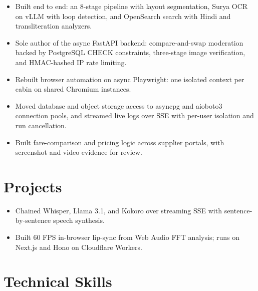 \documentclass[10pt,a4paper]{article}
\begin{document}
\begin{itemize}
  \item Built end to end: an 8-stage pipeline with layout segmentation, Surya OCR on vLLM with loop detection, and OpenSearch search with Hindi and transliteration analyzers.
\end{itemize}

\begin{itemize}
  \item Sole author of the async FastAPI backend: compare-and-swap moderation backed by PostgreSQL CHECK constraints, three-stage image verification, and HMAC-hashed IP rate limiting.
\end{itemize}

\vspace{4pt}

\begin{itemize}
  \item Rebuilt browser automation on async Playwright: one isolated context per cabin on shared Chromium instances.
  \item Moved database and object storage access to asyncpg and aioboto3 connection pools, and streamed live logs over SSE with per-user isolation and run cancellation.
  \item Built fare-comparison and pricing logic across supplier portals, with screenshot and video evidence for review.
\end{itemize}

\section{Projects}
\begin{itemize}
  \item Chained Whisper, Llama 3.1, and Kokoro over streaming SSE with sentence-by-sentence speech synthesis.
  \item Built 60 FPS in-browser lip-sync from Web Audio FFT analysis; runs on Next.js and Hono on Cloudflare Workers.
\end{itemize}

\section{Technical Skills}
\end{document}
